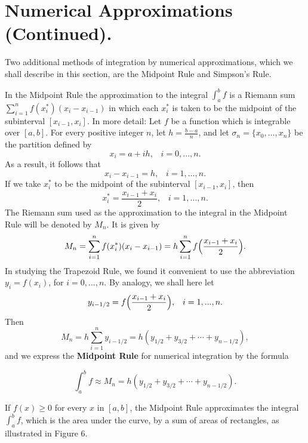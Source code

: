 \section{Numerical Approximations (Continued).}\label{sec 8.3} 
Two additional methods of integration by numerical approximations, which we shall describe in this section, are the Midpoint Rule and Simpson's Rule.

In the Midpoint Rule the approximation to the integral $\int_a^b f$ is a Riemann sum $\sum_{i=1}^{n} f(x_i^*)(x_i - x_{i-1})$ in which each $x_i^*$ is taken to be the midpoint of the subinterval $[x_{i-1}, x_i]$. In more detail: Let $f$ be a function which is integrable over $[a, b]$. For every positive integer $n$, let $h = \frac{b - a}{n}$, and let $\sigma_n = \{ x_0, . . ., x_n \}$ be the partition defined by
$$
x_i = a + ih, \;\;\; i = 0, ... , n. 
$$
\noindent As a result, it follows that 
$$
x_i - x_{i-1} = h, \;\;\; i = 1, ... , n.
$$
\noindent If we take $x_i^*$ to be the midpoint of the subinterval $[x_{i-1}, x_i]$, then
$$
x_i^* = \frac{x_{i-1} + x_i}{2}, \;\;\;  i = 1, ... , n.
$$
\noindent The Riemann sum used as the approximation to the integral in the Midpoint Rule will be denoted by $M_n$. It is given by
$$
M_n = \sum_{i=1}^n f(x_i^*)(x_i - x_{i-1}) = h \sum_{i=1}^n f \Bigl(\frac{x_{i-1}+ x_i}{2} \Bigr) .
$$
\noindent In studying the Trapezoid Rule, we found it convenient to use the abbreviation $y_i = f(x_i)$, for $i = 0, ... , n.$ By analogy, we shall here let
$$
y_{i-1/2} = f \Bigl( \frac{x_{i-1} + x_i}{2} \Bigr), \;\;\;  i = 1, ... , n .
$$
\noindent Then  
$$
M_n = h \sum_{i=1}^n y_{i-1/2} = h (y_{1/2} + y_{3/2} + \cdots + y_{n-1/2}),  
$$
\noindent and we express the \textbf{Midpoint Rule} for numerical integration by the formula

\begin{theorem} %
$$
\int_a^b f \approx M_n = h (y_{1/2} + y_{3/2} + \cdots + y_{n-1/2}) . 
$$
\end{theorem}

If $f(x) \geq 0$ for every $x$ in $[a, b]$, the Midpoint Rule approximates the integral $\int_a^b f$, which is the area under the curve, by a sum of areas of rectangles, as illustrated in Figure 6.


